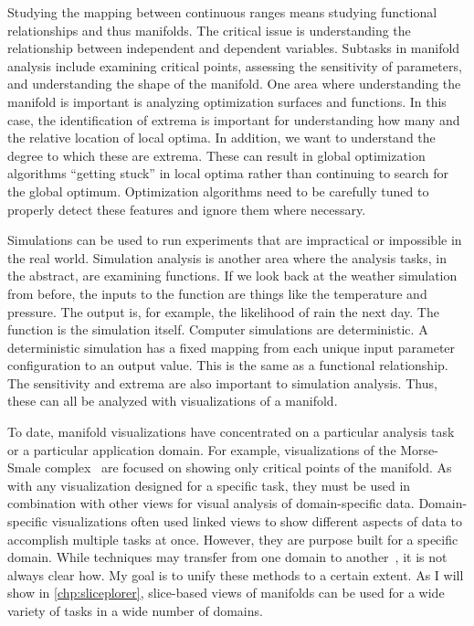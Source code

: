 Studying the mapping between continuous ranges means studying functional
relationships and thus manifolds.  The critical issue is understanding the
relationship between independent and dependent variables.  Subtasks in manifold
analysis include examining critical points, assessing the sensitivity of
parameters, and understanding the shape of the manifold.  
One area where
understanding the manifold is important is analyzing optimization surfaces and
functions.  In this case, the identification of extrema is important for
understanding how many and the relative location of local optima. In addition,
we want to understand the degree to which these are extrema. These can result
in global optimization algorithms ``getting stuck'' in local optima rather than
continuing to search for the global optimum. Optimization algorithms need to be
carefully tuned to properly detect these features and ignore them where
necessary.

Simulations can be used to run experiments that are impractical or impossible
in the real world.  Simulation analysis is another area where the analysis
tasks, in the abstract, are examining functions. If we look back at the weather
simulation from before, the inputs to the function are things like the
temperature and pressure.  The output is, for example, the likelihood of rain
the next day. The function is the simulation itself. Computer simulations are
deterministic.  A deterministic simulation has a fixed mapping from each unique
input parameter configuration to an output value. This is the same as a
functional relationship. The sensitivity and extrema are also important to
simulation analysis.  Thus, these can all be analyzed with visualizations of a
manifold.


To date, manifold visualizations have concentrated on a particular analysis
task or a particular application domain. For example, visualizations of the
Morse-Smale complex~\cite{Gerber:2010} are focused on showing only critical
points of the manifold. As with any visualization designed for a specific task,
they must be used in combination with other views for visual analysis of
domain-specific data. Domain-specific visualizations often used linked views to
show different aspects of data to accomplish multiple tasks at once. However,
they are purpose built for a specific domain. While techniques may transfer
from one domain to another~\cite{Sedlmair:2012}, it is not always clear how.
My goal is to unify these methods to a certain extent.  As I will show in
\autoref{chp:sliceplorer}, slice-based views of manifolds can be used for a
wide variety of tasks in a wide number of domains.

